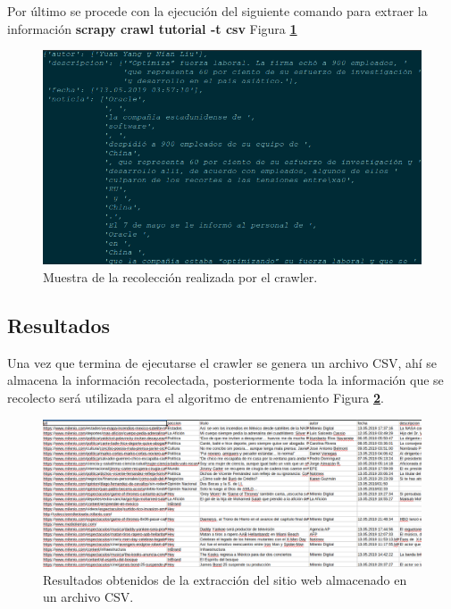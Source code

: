 Por último se procede con la ejecución del siguiente comando para extraer la información \textbf{scrapy crawl tutorial -t csv} Figura \textbf{\ref{fig:ocho}}

\begin{figure}[H]
  \centering
  \includegraphics[scale=.35]{imagenes/Capitulo5/8}
  \caption{Muestra de la recolección realizada por el crawler.}
  \label{fig:ocho}
\end{figure}

\subsection{Resultados}
Una vez que termina de ejecutarse el crawler se genera un archivo CSV, ahí se almacena la información recolectada, posteriormente toda la información 
que se recolecto será utilizada para el algoritmo de entrenamiento Figura \textbf{\ref{fig:nueve}}.

\begin{figure}[H]
  \centering
  \includegraphics[scale=.30]{imagenes/Capitulo5/9}
  \caption{Resultados obtenidos de la extracción del sitio web almacenado en un archivo CSV.}
  \label{fig:nueve}
\end{figure}

